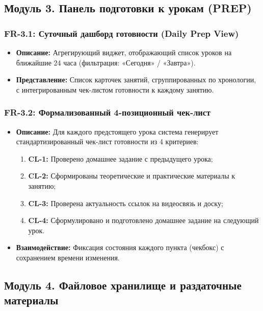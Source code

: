\documentclass[12pt,a4paper]{article}
\begin{document}
\subsection{Модуль 3. Панель подготовки к урокам (PREP)}

\subsubsection*{FR-3.1: Суточный дашборд готовности (Daily Prep View)}
\begin{itemize}
    \item \textbf{Описание:} Агрегирующий виджет, отображающий список уроков на ближайшие 24 часа (фильтрация: «Сегодня» / «Завтра»).
    \item \textbf{Представление:} Список карточек занятий, сгруппированных по хронологии, с интегрированным чек-листом готовности к каждому занятию.
\end{itemize}

\subsubsection*{FR-3.2: Формализованный 4-позиционный чек-лист}
\begin{itemize}
    \item \textbf{Описание:} Для каждого предстоящего урока система генерирует стандартизированный чек-лист готовности из 4 критериев:
          \begin{enumerate}
              \item \textbf{CL-1:} Проверено домашнее задание с предыдущего урока;
              \item \textbf{CL-2:} Сформированы теоретические и практические материалы к занятию;
              \item \textbf{CL-3:} Проверена актуальность ссылок на видеосвязь и доску;
              \item \textbf{CL-4:} Сформулировано и подготовлено домашнее задание на следующий урок.
          \end{enumerate}
    \item \textbf{Взаимодействие:} Фиксация состояния каждого пункта (чекбокс) с сохранением времени изменения.
\end{itemize}

\subsection{Модуль 4. Файловое хранилище и раздаточные материалы}
\end{document}
